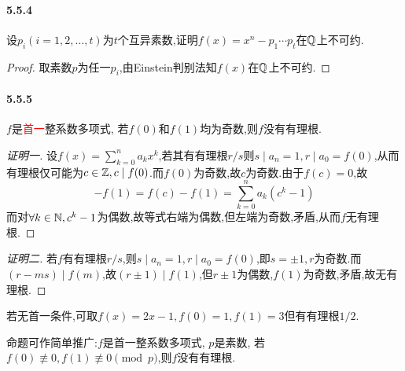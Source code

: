 \documentclass[11pt]{article}
\begin{document}
\paragraph{5.5.4}设$p_i (i=1,2,\dots,t)$为$t$个互异素数,证明$f(x)=x^n-p_1\cdots p_t$在$\mathbb{Q}$上不可约.
\begin{proof}
    取素数$p$为任一$p_i$,由Einstein判别法知$f(x)$在$\mathbb{Q}$上不可约.
\end{proof}
\paragraph{5.5.5}$f$是\textcolor{red}{首一}整系数多项式, 若$f(0)$和$f(1)$均为奇数,则$f$没有有理根.
\begin{proof}[证明一]
    设$f(x)=\sum_{k=0}^{n}a_kx^k$,若其有有理根$r/s$则$s\mid a_n=1, r\mid a_0=f(0)$,从而有理根仅可能为$c\in \mathbb{Z}, c\mid f(0)$.而$f(0)$为奇数,故$c$为奇数.由于$f(c)=0$,故
    $$-f(1)=f(c)-f(1)=\sum_{k=0}^{n}a_k(c^k-1)$$
    而对$\forall k\in\mathbb{N}, c^k-1$为偶数,故等式右端为偶数,但左端为奇数,矛盾,从而$f$无有理根.
\end{proof}
\begin{proof}[证明二]
    若$f$有有理根$r/s$,则$s\mid a_n=1, r\mid a_0=f(0)$,即$s=\pm 1, r$为奇数.而$(r-ms)\mid f(m)$,故$(r\pm 1)\mid f(1)$,但$r\pm 1$为偶数,$f(1)$为奇数,矛盾,故无有理根.
\end{proof}
\begin{remark}
    若无首一条件,可取$f(x)=2x-1, f(0)=1, f(1)=3$但有有理根$1/2$.
\end{remark}
\begin{remark}
    命题可作简单推广:$f$是首一整系数多项式, $p$是素数, 若$f(0)\not\equiv 0, f(1)\not\equiv 0 \pmod p$,则$f$没有有理根.
\end{remark}

\end{document}

